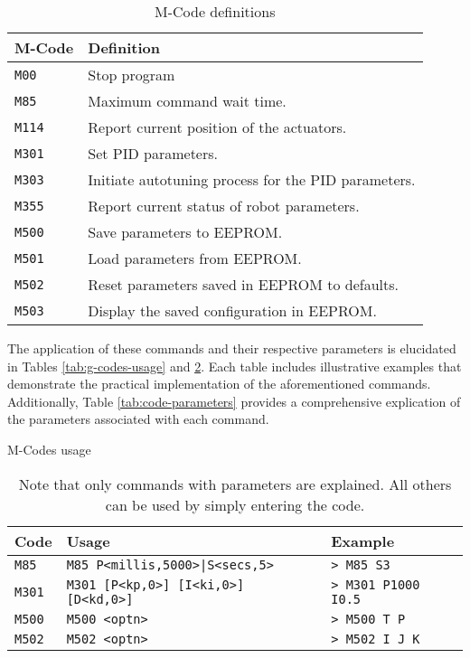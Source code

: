 \begingroup
\setlength{\tabcolsep}{10pt} %
\renewcommand{\arraystretch}{1.2} %
\begin{table}[H]
    \centering
    \caption{M-Code definitions}
    \label{tab:m-definitions}
    \begin{tabular}{ll}
    \toprule
    M-Code & Definition \\ \midrule
    \texttt{M00} & Stop program \\
    \texttt{M85} & Maximum command wait time. \\
    \texttt{M114} & Report current position of the actuators. \\
    \texttt{M301} & Set PID parameters. \\
    \texttt{M303} & Initiate autotuning process for the PID parameters. \\
    \texttt{M355} & Report current status of robot parameters. \\
    \texttt{M500} & Save parameters to EEPROM. \\
    \texttt{M501} & Load parameters from EEPROM. \\
    \texttt{M502} & Reset parameters saved in EEPROM to defaults. \\
    \texttt{M503} & Display the saved configuration in EEPROM. \\ \bottomrule
    \end{tabular}
\end{table}
\endgroup

The application of these commands and their respective parameters is elucidated in Tables \ref{tab:g-codes-usage} and \ref{tab:m-codes-usage}. Each table includes illustrative examples that demonstrate the practical implementation of the aforementioned commands. Additionally, Table \ref{tab:code-parameters} provides a comprehensive explication of the parameters associated with each command.

\newcommand{\prompt}{\texttt{> }}

\begingroup
\setlength{\tabcolsep}{10pt}
\renewcommand{\arraystretch}{1.5}
\begin{table}[H]
    \centering
    \caption{M-Codes usage}
    \caption*{Note that only commands with parameters are explained. All others can be used by simply entering the code.}
    \label{tab:m-codes-usage}
    \begin{tabular}{p{}p{}p{}}
    \toprule
    Code & Usage & Example \\ \midrule
    \texttt{M85} & \texttt{M85 P<millis,5000>|S<secs,5>} & \prompt\texttt{M85 S3} \\
    \texttt{M301} & \texttt{M301 [P<kp,0>] [I<ki,0>] [D<kd,0>]} & \prompt\texttt{M301 P1000 I0.5} \\
    \texttt{M500} & \texttt{M500 <optn>} & \prompt\texttt{M500 T P} \\
    \texttt{M502} & \texttt{M502 <optn>} & \prompt\texttt{M502 I J K}\\
    \bottomrule
    \end{tabular}
\end{table}
\endgroup

